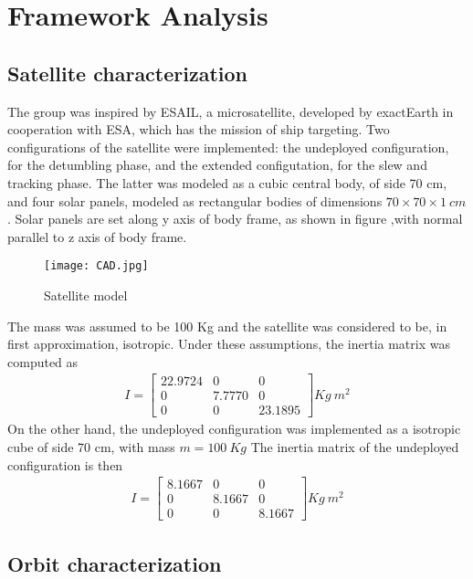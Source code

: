 \section{Framework Analysis}
\label{sec:framework}

\subsection{Satellite characterization }
\label{subsec:sat_characterization}
The group was inspired by ESAIL, a microsatellite, developed by exactEarth in cooperation with ESA, which has the mission of ship targeting. Two configurations of the satellite were implemented: the undeployed configuration, for the detumbling phase, and the extended configutation, for the slew and tracking phase. The latter was modeled as a cubic central body, of side 70 cm, and four solar panels, modeled as rectangular bodies of dimensions $70\times 70 \times  1 \ cm$. Solar panels are set along y axis of body frame, as shown in figure ,with normal parallel to z axis of body frame.  
\begin{figure}[H]
\centering
\texttt{[image: CAD.jpg]}
        \vspace{2.5mm}
\caption{Satellite model}
\end{figure}
The mass was assumed to be 100 Kg  and the satellite was considered to be, in first approximation, isotropic. Under these assumptions, the inertia matrix was computed as 
\begin{align}
    I = \begin{bmatrix}
        22.9724 & 0 & 0 \\
        0 & 7.7770 & 0 \\
        0 & 0 & 23.1895
    \end{bmatrix} Kg \ m^2
  \end{align}
On the other hand, the undeployed configuration was implemented as a  isotropic cube of side 70 cm, with mass $m=100 \ Kg$
The inertia matrix of the undeployed configuration is then 
\begin{align}
    I = \begin{bmatrix}
        8.1667 & 0 & 0 \\
        0 & 8.1667 & 0 \\
        0 & 0 & 8.1667
    \end{bmatrix} Kg \ m^2
  \end{align}

\subsection{Orbit characterization}
\label{subsec:orbit_characterization}

